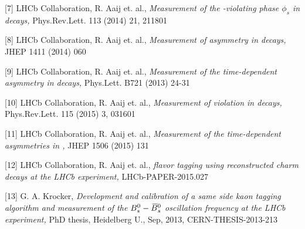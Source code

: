 {\begin{minipage}{0.32\boxwidth}
\begin{compactitem}
\end{compactitem}
\begin{compactitem}
{\fontsize{4}{4}     \selectfont\item[{[7]}] LHCb Collaboration, R. Aaij et. al., {\it Measurement of the \CP-violating phase $\phi_s$ in \BsToDsDs decays, } Phys.Rev.Lett. 113 (2014) 21, 211801}
\end{compactitem}
\begin{compactitem}
{\fontsize{4}{4}     \selectfont\item[{[8]}] LHCb Collaboration, R. Aaij et. al., {\it Measurement of \CP asymmetry in \mbox{\BsToDsK} decays, } JHEP 1411 (2014) 060}
\end{compactitem}
\begin{compactitem}
{\fontsize{4}{4}     \selectfont\item[{[9]}] LHCb Collaboration, R. Aaij et. al., {\it Measurement of the time-dependent \CP asymmetry in \BdToJPsiKS decays, } Phys.Lett. B721 (2013) 24-31}
\end{compactitem}
\vspace{0.10em}
\end{minipage}
\hspace{0.1em}
\begin{minipage}{0.32\boxwidth}
\begin{compactitem}
{\fontsize{4}{4}     \selectfont\item[{[10]}] LHCb Collaboration, R. Aaij et. al., {\it Measurement of \CP violation in \mbox{\BdToJPsiKS} decays, } Phys.Rev.Lett. 115 (2015) 3, 031601}
\end{compactitem}
\begin{compactitem}
{\fontsize{4}{4}     \selectfont\item[{[11]}] LHCb Collaboration, R. Aaij et. al., {\it Measurement of the time-dependent \CP asymmetries in \BsToJPsiKS, } JHEP 1506 (2015) 131}
\end{compactitem}
\begin{compactitem}
{\fontsize{4}{4}     \selectfont\item[{[12]}] LHCb Collaboration, R. Aaij et. al., {\it \B flavor tagging using reconstructed charm decays at the LHCb experiment, } LHCb-PAPER-2015.027}
\end{compactitem}
\begin{compactitem}
{\fontsize{4}{4}     \selectfont\item[{[13]}] G. A. Krocker, {\it Development and calibration of a same side kaon tagging algorithm and measurement of the $B^0_s-\kern 0.18em\overline{\kern -0.18em B}{}^0_s$ oscillation frequency \dms at the LHCb experiment, } PhD thesis, Heidelberg U., Sep, 2013, CERN-THESIS-2013-213}
\end{compactitem}
\end{minipage}
}
